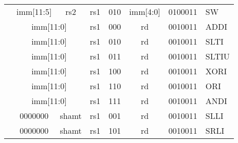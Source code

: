 \begin{table}[p]
\begin{small}
\begin{center}
\begin{tabular}{p{0in}p{0.4in}p{0.05in}p{0.05in}p{0.05in}p{0.05in}p{0.4in}p{0.6in}p{0.4in}p{0.6in}p{0.7in}l}
        &
        \multicolumn{4}{|c|}{imm[11:5]} &
        \multicolumn{2}{c|}{rs2} &
        \multicolumn{1}{c|}{rs1} &
        \multicolumn{1}{c|}{010} &
        \multicolumn{1}{c|}{imm[4:0]} &
        \multicolumn{1}{c|}{0100011} & SW \\
        \cline{2-11}

        &
        \multicolumn{6}{|c|}{imm[11:0]} &
        \multicolumn{1}{c|}{rs1} &
        \multicolumn{1}{c|}{000} &
        \multicolumn{1}{c|}{rd} &
        \multicolumn{1}{c|}{0010011} & ADDI \\
        \cline{2-11}

        &
        \multicolumn{6}{|c|}{imm[11:0]} &
        \multicolumn{1}{c|}{rs1} &
        \multicolumn{1}{c|}{010} &
        \multicolumn{1}{c|}{rd} &
        \multicolumn{1}{c|}{0010011} & SLTI \\
        \cline{2-11}

        &
        \multicolumn{6}{|c|}{imm[11:0]} &
        \multicolumn{1}{c|}{rs1} &
        \multicolumn{1}{c|}{011} &
        \multicolumn{1}{c|}{rd} &
        \multicolumn{1}{c|}{0010011} & SLTIU \\
        \cline{2-11}

        &
        \multicolumn{6}{|c|}{imm[11:0]} &
        \multicolumn{1}{c|}{rs1} &
        \multicolumn{1}{c|}{100} &
        \multicolumn{1}{c|}{rd} &
        \multicolumn{1}{c|}{0010011} & XORI \\
        \cline{2-11}

        &
        \multicolumn{6}{|c|}{imm[11:0]} &
        \multicolumn{1}{c|}{rs1} &
        \multicolumn{1}{c|}{110} &
        \multicolumn{1}{c|}{rd} &
        \multicolumn{1}{c|}{0010011} & ORI \\
        \cline{2-11}

        &
        \multicolumn{6}{|c|}{imm[11:0]} &
        \multicolumn{1}{c|}{rs1} &
        \multicolumn{1}{c|}{111} &
        \multicolumn{1}{c|}{rd} &
        \multicolumn{1}{c|}{0010011} & ANDI \\
        \cline{2-11}

        &
        \multicolumn{4}{|c|}{0000000} &
        \multicolumn{2}{c|}{shamt} &
        \multicolumn{1}{c|}{rs1} &
        \multicolumn{1}{c|}{001} &
        \multicolumn{1}{c|}{rd} &
        \multicolumn{1}{c|}{0010011} & SLLI \\
        \cline{2-11}

        &
        \multicolumn{4}{|c|}{0000000} &
        \multicolumn{2}{c|}{shamt} &
        \multicolumn{1}{c|}{rs1} &
        \multicolumn{1}{c|}{101} &
        \multicolumn{1}{c|}{rd} &
        \multicolumn{1}{c|}{0010011} & SRLI \\
        \cline{2-11}


\end{tabular}
\end{center}
\end{small}
\end{table}
